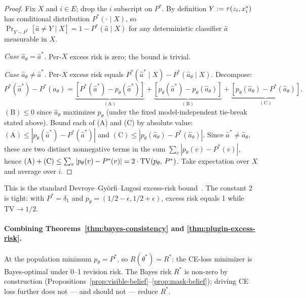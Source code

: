 \begin{proof}
Fix $X$ and $i \in E$; drop the $i$ subscript on $P^*$. By definition $Y := \tau(z_i, x^{\ast}_i)$ has conditional distribution $P^*(\cdot \mid X)$, so $\Pr_{Y \sim P^*}[\hat{a} \neq Y \mid X] = 1 - P^*(\hat{a} \mid X)$ for any deterministic classifier $\hat{a}$ measurable in $X$.

\emph{Case $\hat{a}_\theta = \hat{a}^*$.} Per-$X$ excess risk is zero; the bound is trivial.

\emph{Case $\hat{a}_\theta \neq \hat{a}^*$.} Per-$X$ excess risk equals $P^*(\hat{a}^* \mid X) - P^*(\hat{a}_\theta \mid X)$. Decompose:
\[
P^*(\hat{a}^*) - P^*(\hat{a}_\theta) = \underbrace{[P^*(\hat{a}^*) - p_\theta(\hat{a}^*)]}_{(\mathrm{A})} + \underbrace{[p_\theta(\hat{a}^*) - p_\theta(\hat{a}_\theta)]}_{(\mathrm{B})} + \underbrace{[p_\theta(\hat{a}_\theta) - P^*(\hat{a}_\theta)]}_{(\mathrm{C})}.
\]
$(\mathrm{B}) \leq 0$ since $\hat{a}_\theta$ maximizes $p_\theta$ (under the fixed model-independent tie-break stated above). Bound each of (A) and (C) by absolute value: $(\mathrm{A}) \leq |p_\theta(\hat{a}^*) - P^*(\hat{a}^*)|$ and $(\mathrm{C}) \leq |p_\theta(\hat{a}_\theta) - P^*(\hat{a}_\theta)|$. Since $\hat{a}^* \neq \hat{a}_\theta$, these are two distinct nonnegative terms in the sum $\sum_v |p_\theta(v) - P^*(v)|$, hence $(\mathrm{A}) + (\mathrm{C}) \leq \sum_v |p_\theta(v) - P^*(v)| = 2 \cdot \mathrm{TV}\!\left(p_\theta,\,P^*\right)$. Take expectation over $X$ and average over $i$.
\end{proof}

\begin{remark}
This is the standard Devroye--Györfi--Lugosi excess-risk bound~\cite[Theorem~2.2]{devroye2013probabilistic}. The constant 2 is tight: with $P^* = \delta_1$ and $p_\theta = (1/2 - \epsilon, 1/2 + \epsilon)$, excess risk equals 1 while $\mathrm{TV} \to 1/2$.
\end{remark}

\paragraph{Combining Theorems~\ref{thm:bayes-consistency} and \ref{thm:plugin-excess-risk}.}
At the population minimum $p_\theta = P^*$, so $R(\theta^*) = R^*$: the CE-loss minimizer is Bayes-optimal under 0--1 revision risk. The Bayes risk $R^*$ is non-zero by construction (Propositions~\ref{prop:visible-belief}--\ref{prop:mask-belief}); driving CE loss further does not --- and should not --- reduce $R^*$.

